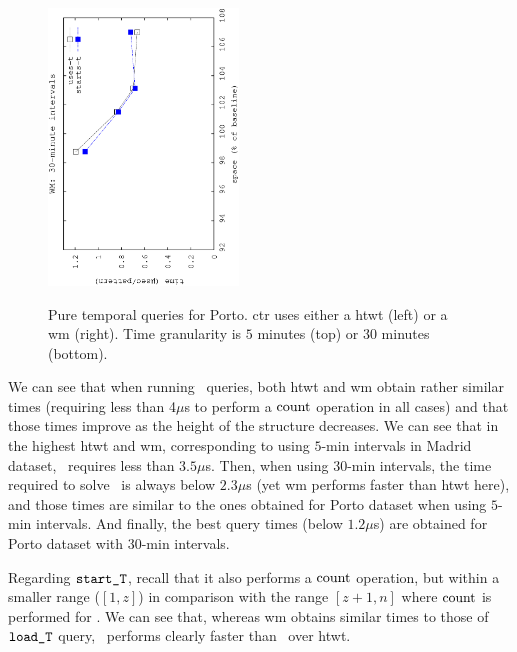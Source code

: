 \begin{figure}[!ht]
\begin{center}
				{\includegraphics[angle=-90,width=0.45\textwidth]{figures_synt/porto_t30mwm.eps}}
		\end{center}
		\vspace{-0.5cm}
		\caption{Pure temporal queries for Porto. \acrshort{ctr} uses either a \acrlong{htwt} (left) or a \acrlong{wm} (right). 
			Time granularity is $5$ minutes (top) or $30$ minutes (bottom).}
		\label{fig:portost_topk}
	\end{figure}



	We can see that when running \loadT\ queries, both \gls{htwt} and \gls{wm} obtain rather similar times (requiring less than 4$\mu$s 
	to perform a $\operatorname{count}$ operation in all cases) and that those times improve as the height of the structure decreases. We can see 
	that in the highest \gls{htwt} and \gls{wm}, corresponding to using $5$-min intervals in Madrid dataset, \loadT\ requires less
	than $3.5\mu$s. Then, when using $30$-min intervals, the time required to solve \loadT\ is always below $2.3\mu$s (yet
	\gls{wm} performs faster than \gls{htwt} here), and those times are similar to the ones obtained for Porto dataset when
	using $5$-min intervals. And finally, the best query times (below $1.2\mu$s) are obtained for Porto dataset with 
	$30$-min intervals.

	Regarding $\texttt{start\_T}$, recall that it also performs a $\operatorname{count}$ operation, but within a smaller range ($[1,z]$) in comparison with the range
	$[z+1,n]$ where  $\operatorname{count}$ is performed for \loadT. We can see that, whereas \gls{wm} obtains similar times to those of 
	$\texttt{load\_T}$ query,  \startT\ performs clearly faster than \loadT\ over \gls{htwt}.




